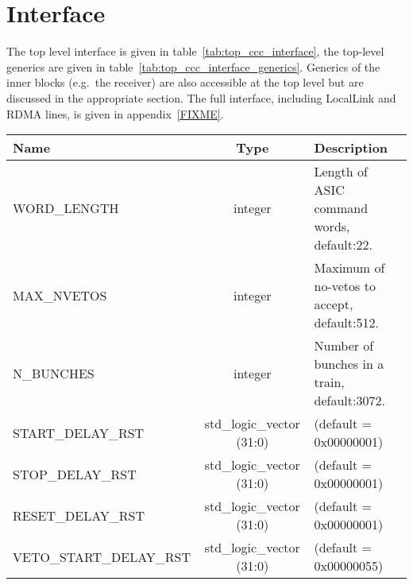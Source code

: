 \documentclass[]{report}
\newcommand*{\dittostraight}{---\textquotedbl---} %
\begin{document}
    \section{Interface} %
    \label{sub:top_interface}
    The top level interface is given in table~\ref{tab:top_ccc_interface}, the top-level generics are given in table~\ref{tab:top_ccc_interface_generics}. Generics of the inner blocks (e.g.\ the receiver) are also accessible at the top level but are discussed in the appropriate section. The full interface, including LocalLink and RDMA lines, is given in appendix~\ref{FIXME}. %
    \begin{table}
        \begin{center}
            \begin{tabulary}{\textwidth}{l | c | L}
                Name & Type & Description \\
                \hline
                WORD\_LENGTH               & integer                   & Length of ASIC command words, default:22.    \\
                MAX\_NVETOS                & integer                   & Maximum of no-vetos to accept, default:512.  \\
                N\_BUNCHES                 & integer                   & Number of bunches in a train, default:3072.  \\ 
                START\_DELAY\_RST          & std\_logic\_vector (31:0) & (default = 0x00000001)                \\
                STOP\_DELAY\_RST           & std\_logic\_vector (31:0) & (default = 0x00000001)                \\
                RESET\_DELAY\_RST          & std\_logic\_vector (31:0) & (default = 0x00000001)                \\
                VETO\_START\_DELAY\_RST    & std\_logic\_vector (31:0) & (default = 0x00000055)                \\

\end{tabulary}
\end{center}
\end{table}
\end{document}
